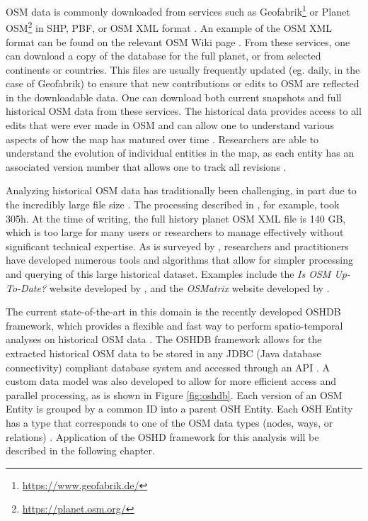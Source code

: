 OSM data is commonly downloaded from services such as Geofabrik\footnote{\url{https://www.geofabrik.de/}} or Planet OSM\footnote{\url{https://planet.osm.org/}} in SHP, PBF, or OSM XML format \parencite{mooney_accessing_2011}. An example of the OSM XML format can be found on the relevant OSM Wiki page \parencite{noauthor_osm_2017}. From these services, one can download a copy of the database for the full planet, or from selected continents or countries. This files are usually frequently updated (eg. daily, in the case of Geofabrik) to ensure that new contributions or edits to OSM are reflected in the downloadable data. One can download both current snapshots and full historical OSM data from these services. The historical data provides access to all edits that were ever made in OSM and can allow one to understand various aspects of how the map has matured over time \parencite{corcoran_analysing_2013, mooney_characteristics_2012}. Researchers are able to understand the evolution of individual entities in the map, as each entity has an associated version number that allows one to track all revisions \parencite{noauthor_elements_2020}. 

Analyzing historical OSM data has traditionally been challenging, in part due to the incredibly large file size \parencite{raifer_oshdb_2019, mooney_accessing_2011}. The processing described in \textcite{mooney_characteristics_2012}, for example, took 305h. At the time of writing, the full history planet OSM XML file is 140 GB, which is too large for many users or researchers to manage effectively without significant technical expertise. As is surveyed by \textcite{raifer_oshdb_2019}, researchers and practitioners have developed numerous tools and algorithms that allow for simpler processing and querying of this large historical dataset. Examples include the \textit{Is OSM Up-To-Date?} website developed by \textcite{minghini_open_2018}, and the \textit{OSMatrix} website developed by \textcite{roick_technical_2012}. 

The current state-of-the-art in this domain is the recently developed OSHDB framework, which provides a flexible and fast way to perform spatio-temporal analyses on historical OSM data \parencite{raifer_oshdb_2019}. The OSHDB framework allows for the extracted historical OSM data to be stored in any JDBC (Java database connectivity) compliant database system and accessed through an API \parencite{raifer_oshdb_2019}. A custom data model was also developed to allow for more efficient access and parallel processing, as is shown in Figure \ref{fig:oshdb}. Each version of an OSM Entity is grouped by a common ID into a parent OSH Entity. Each OSH Entity has a type that corresponds to one of the OSM data types (nodes, ways, or relations) \parencite{raifer_oshdb_2019}. Application of the OSHD framework for this analysis will be described in the following chapter.

